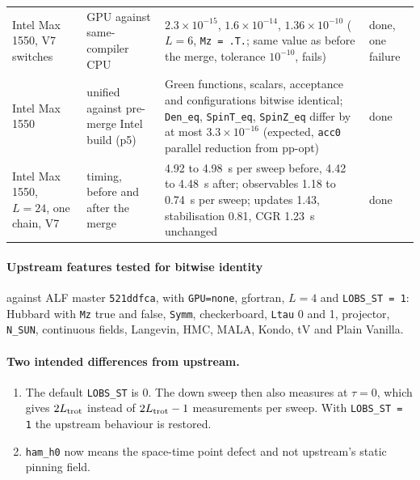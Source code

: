 \begin{table}[h]
\begin{tabularx}{\textwidth}{@{}p{3.1cm}p{4.2cm}Xl@{}}
Intel Max 1550, V7 switches & GPU against same-compiler CPU & $2.3\times10^{-15}$, $1.6\times10^{-14}$, $1.36\times10^{-10}$ ($L=6$, \texttt{Mz = .T.}; same value as before the merge, tolerance $10^{-10}$, fails) & done, one failure \\ %
Intel Max 1550 & unified against pre-merge Intel build (p5) & Green functions, scalars, acceptance and configurations bitwise identical; \texttt{Den\_eq}, \texttt{SpinT\_eq}, \texttt{SpinZ\_eq} differ by at most $3.3\times10^{-16}$ (expected, \texttt{acc0} parallel reduction from pp-opt) & done \\ %
Intel Max 1550, $L=24$, one chain, V7 & timing, before and after the merge & 4.92 to 4.98~s per sweep before, 4.42 to 4.48~s after; observables 1.18 to 0.74~s per sweep; updates 1.43, stabilisation 0.81, CGR 1.23~s unchanged & done \\ %
\bottomrule
\end{tabularx}
\end{table}

\paragraph{Upstream features tested for bitwise identity} against ALF master \texttt{521ddfca}, with \texttt{GPU=none}, gfortran, $L=4$ and \texttt{LOBS\_ST = 1}: Hubbard with \texttt{Mz} true and false, \texttt{Symm}, checkerboard, \texttt{Ltau} 0 and 1, projector, \texttt{N\_SUN}, continuous fields, Langevin, HMC, MALA, Kondo, tV and Plain Vanilla.

\paragraph{Two intended differences from upstream.}
\begin{enumerate}
\item The default \texttt{LOBS\_ST} is 0. The down sweep then also measures at $\tau=0$, which gives $2L_{\rm trot}$ instead of $2L_{\rm trot}-1$ measurements per sweep. With \texttt{LOBS\_ST = 1} the upstream behaviour is restored.
\item \texttt{ham\_h0} now means the space-time point defect and not upstream's static pinning field.
\end{enumerate}

